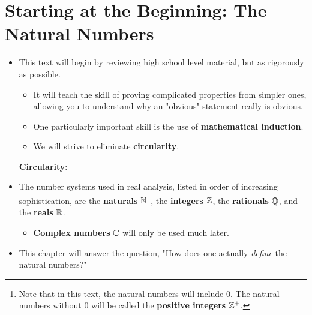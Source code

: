 \documentclass[../main.tex]{subfiles}
\begin{document}
\chapter{Starting at the Beginning: The Natural Numbers}\label{chr:2}
\begin{itemize}
    \item {}This text will begin by reviewing high school level material, but as rigorously as possible.
    \begin{itemize}
        \item It will teach the skill of proving complicated properties from simpler ones, allowing you to understand why an "obvious" statement really is obvious.
        \item One particularly important skill is the use of \textbf{mathematical induction}.
        \item We will strive to eliminate \textbf{circularity}.
    \end{itemize}
    \textbf{Circularity}: 
    \item The number systems used in real analysis, listed in order of increasing sophistication, are the \textbf{naturals} $\mathbb{N}$\footnote{Note that in this text, the natural numbers will include 0. The natural numbers without 0 will be called the \textbf{positive integers} $\mathbb{Z}^+$.}, the \textbf{integers} $\mathbb{Z}$, the \textbf{rationals} $\mathbb{Q}$, and the \textbf{reals} $\mathbb{R}$.
    \begin{itemize}
        \item \textbf{Complex numbers} $\mathbb{C}$ will only be used much later.
    \end{itemize}
    \item This chapter will answer the question, "How does one actually \emph{define} the natural numbers?"
\end{itemize}
\end{document}
